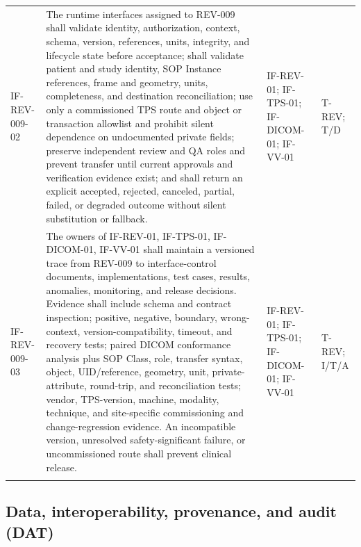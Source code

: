 \documentclass[11pt,letterpaper]{article}
\begin{document}
\begin{scriptsize}
\begin{longtable}{@{}L{0.14\textwidth}L{0.49\textwidth}L{0.19\textwidth}L{0.10\textwidth}@{}}
\addlinespace[2pt]
\mbox{IF-REV-009-02} & The runtime interfaces assigned to REV-009 shall validate identity, authorization, context, schema, version, references, units, integrity, and lifecycle state before acceptance; shall validate patient and study identity, SOP Instance references, frame and geometry, units, completeness, and destination reconciliation; use only a commissioned TPS route and object or transaction allowlist and prohibit silent dependence on undocumented private fields; preserve independent review and QA roles and prevent transfer until current approvals and verification evidence exist; and shall return an explicit accepted, rejected, canceled, partial, failed, or degraded outcome without silent substitution or fallback. & IF-REV-01; IF-TPS-01; IF-DICOM-01; IF-VV-01 & T-REV; T\slash\allowbreak{}D \\
\addlinespace[2pt]
\mbox{IF-REV-009-03} & The owners of IF-REV-01, IF-TPS-01, IF-DICOM-01, IF-VV-01 shall maintain a versioned trace from REV-009 to interface-control documents, implementations, test cases, results, anomalies, monitoring, and release decisions. Evidence shall include schema and contract inspection; positive, negative, boundary, wrong-context, version-compatibility, timeout, and recovery tests; paired DICOM conformance analysis plus SOP Class, role, transfer syntax, object, UID\slash\allowbreak{}reference, geometry, unit, private-attribute, round-trip, and reconciliation tests; vendor, TPS-version, machine, modality, technique, and site-specific commissioning and change-regression evidence. An incompatible version, unresolved safety-significant failure, or uncommissioned route shall prevent clinical release. & IF-REV-01; IF-TPS-01; IF-DICOM-01; IF-VV-01 & T-REV; I\slash\allowbreak{}T\slash\allowbreak{}A \\
\addlinespace[2pt]
\end{longtable}
\end{scriptsize}

\subsection{Data, interoperability, provenance, and audit (DAT)}
\end{document}
